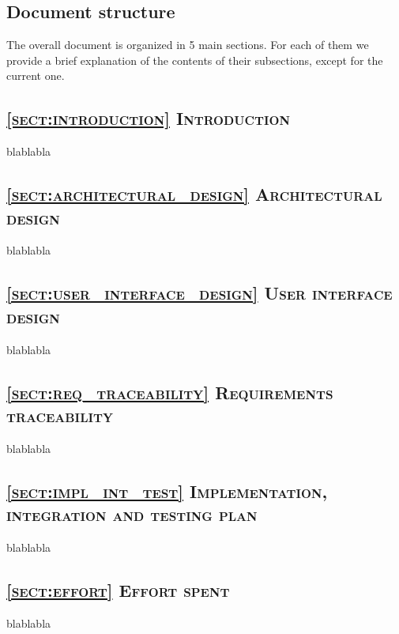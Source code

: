



\subsection{Document structure}
\label{sec:doc_struct}
The overall document is organized in 5 main sections. For each of them we provide a brief explanation of the contents of their subsections, except for the current one.

\subsection*{\textsc{\textcolor{myblue}{\ref{sect:introduction} Introduction}}}
blablabla

\subsection*{\textsc{\textcolor{myblue}{\ref{sect:architectural_design} Architectural design}}}
blablabla

\subsection*{\textsc{\textcolor{myblue}{\ref{sect:user_interface_design} User interface design}}}
blablabla

\subsection*{\textsc{\textcolor{myblue}{\ref{sect:req_traceability} Requirements traceability}}}
blablabla

\subsection*{\textsc{\textcolor{myblue}{\ref{sect:impl_int_test} Implementation, integration and testing plan}}}
blablabla


\subsection*{\textsc{\textcolor{myblue}{\ref{sect:effort} Effort spent}}}
blablabla


